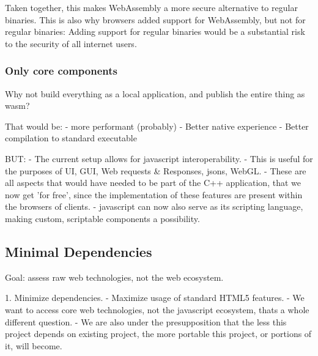 Taken together, this makes WebAssembly a more secure alternative to regular binaries. This is also why browsers added support for WebAssembly, but not for regular binaries: Adding support for regular binaries would be a substantial risk to the security of all internet users.



\subsubsection*{Only core components}

Why not build everything as a local application, and publish the entire thing as wasm?

That would be:
- more performant (probably)
- Better native experience
- Better compilation to standard executable

BUT:
- The current setup allows for javascript interoperability. 
  - This is useful for the purposes of UI, GUI, Web requests \& Responses, jsons, WebGL.
  - These are all aspects that would have needed to be part of the C++ application, that we now get 'for free', since the implementation of these features are present within the browsers of clients. 
- javascript can now also serve as its scripting language, making custom, scriptable components a possibility.




\subsection{Minimal Dependencies}

Goal: assess raw web technologies, not the web ecosystem. 

1. Minimize dependencies. 
  - Maximize usage of standard HTML5 features.
  - We want to access core web technologies, not the javascript ecosystem, thats a whole different question. 
  - We are also under the presupposition that the less this project depends on existing project, the more portable this project, or portions of it, will become.

